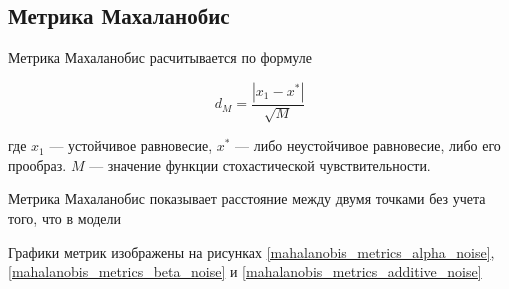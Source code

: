 \subsection{Метрика Махаланобис}
        

    Метрика Махаланобис расчитывается по формуле 

    \[d_M = \frac{|x_1 - x^*|}{\sqrt{M}}\]
        
    где \(x_1\) --- устойчивое равновесие, \(x^*\) --- либо неустойчивое равновесие, либо его прообраз. \(M\) --- значение функции стохастической чувствительности.

    Метрика Махаланобис показывает расстояние между двумя точками без учета того, что в модели 

    Графики метрик изображены на рисунках \ref{mahalanobis_metrics_alpha_noise}, \ref{mahalanobis_metrics_beta_noise} и \ref{mahalanobis_metrics_additive_noise}

